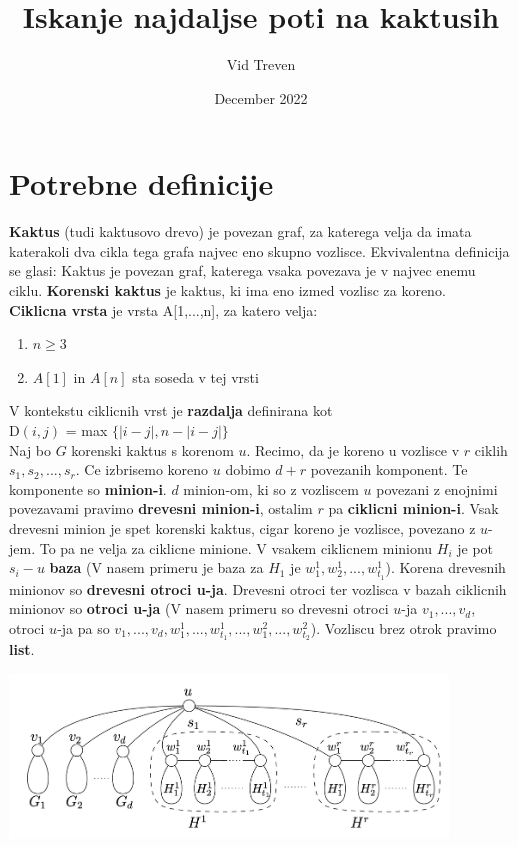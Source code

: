 \documentclass{article}
\title{Iskanje najdaljse poti na kaktusih}
\author{Vid Treven}
\date{December 2022}
\begin{document}
\maketitle

\section{Potrebne definicije}

\textbf{Kaktus} (tudi kaktusovo drevo) je povezan graf, za katerega velja da imata katerakoli dva cikla tega grafa najvec eno skupno vozlisce. Ekvivalentna definicija se glasi: Kaktus je povezan graf, katerega vsaka povezava je v najvec enemu ciklu. \textbf{Korenski kaktus} je kaktus, ki ima eno izmed vozlisc za koreno. \\
\textbf{Ciklicna vrsta} je vrsta A[1,...,n], za katero velja: 
\begin{enumerate}
    \item $n \geq 3$
    \item $A[1]$ in $A[n]$ sta soseda v tej vrsti
\end{enumerate}
V kontekstu ciklicnih vrst je \textbf{razdalja} definirana kot \\ D$(i,j)$ = max $\{|i-j|, n-|i-j|\}$ \\
Naj bo $G$ korenski kaktus s korenom $u$. Recimo, da je koreno u vozlisce v $r$ ciklih $s_1, s_2, ..., s_r$. Ce izbrisemo koreno $u$ dobimo $d+r$ povezanih komponent. Te komponente so \textbf{minion-i}. $d$ minion-om, ki so z vozliscem $u$ povezani z enojnimi povezavami pravimo \textbf{drevesni minion-i}, ostalim $r$ pa \textbf{ciklicni minion-i}. Vsak drevesni minion je spet korenski kaktus, cigar koreno je vozlisce, povezano z $u$-jem. To pa ne velja za ciklicne minione. V vsakem ciklicnem minionu $H_i$ je pot $s_i - u$ \textbf{baza} (V nasem primeru je baza za $H_1$ je $w_1^1, w_2^1, ..., w^1_{t_1}$). Korena drevesnih minionov so \textbf{drevesni otroci u-ja}. Drevesni otroci ter vozlisca v bazah ciklicnih minionov so \textbf{otroci u-ja} (V nasem primeru so drevesni otroci $u$-ja $v_1, ... ,v_d$, otroci $u$-ja pa so $v_1, ..., v_d, w_1^1, ..., w^1_{t_1}, ..., w_1^2, ..., w^2_{t_2}$). Vozliscu brez otrok pravimo \textbf{list}.

\includegraphics[width=330pt]{kaktus.png}
\end{document}
